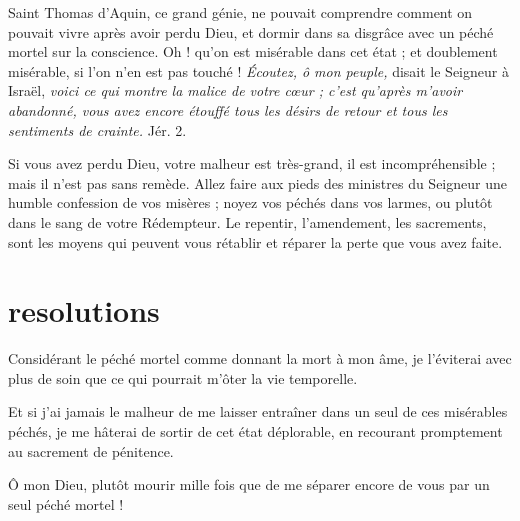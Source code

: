\documentclass[instructions.tex]{subfiles}
\begin{document}
Saint Thomas d’Aquin, ce grand génie, ne pouvait comprendre comment on pouvait vivre après avoir perdu Dieu, et dormir dans sa disgrâce avec un péché mortel sur la conscience. Oh ! qu’on est misérable dans cet état ; et doublement misérable, si l’on n’en est pas touché ! \textit{Écoutez, ô mon peuple,} disait le Seigneur à Israël, \textit{voici ce qui montre la malice de votre cœur ; c’est qu’après m’avoir abandonné, vous avez encore étouffé tous les désirs de retour et tous les sentiments de crainte.} Jér. 2.

Si vous avez perdu Dieu, votre malheur est très-grand, il est incompréhensible ; mais il n’est pas sans remède. Allez faire aux pieds des ministres du Seigneur une humble confession de vos misères ; noyez vos péchés dans vos larmes, ou plutôt dans le sang de votre Rédempteur. Le repentir, l’amendement, les sacrements, sont les moyens qui peuvent vous rétablir et réparer la perte que vous avez faite.

\section{resolutions}

\primo Considérant le péché mortel comme donnant la mort à mon âme, je l’éviterai avec plus de soin que ce qui pourrait m’ôter la vie temporelle.

\secundo Et si j’ai jamais le malheur de me laisser entraîner dans un seul de ces misérables péchés, je me hâterai de sortir de cet état déplorable, en recourant promptement au sacrement de pénitence.

Ô mon Dieu, plutôt mourir mille fois que de me séparer encore de vous par un seul péché mortel !
\end{document}
